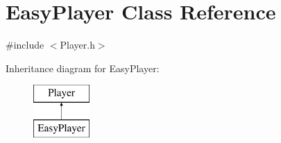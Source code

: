 \hypertarget{class_easy_player}{}\section{Easy\+Player Class Reference}
\label{class_easy_player}


{\ttfamily \#include $<$Player.\+h$>$}

Inheritance diagram for Easy\+Player\+:\begin{figure}[H]
\begin{center}
\leavevmode
\includegraphics[height=2.000000cm]{class_easy_player}
\end{center}
\end{figure}
